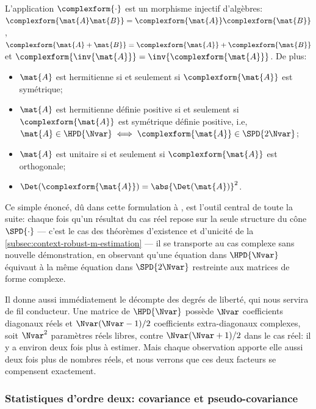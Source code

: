\begin{property}
\label{prop:context-complex-transport}
  L'application $\complexform{\cdot}$ est un morphisme injectif d'algèbres: $\complexform{\mat{A}\mat{B}} = \complexform{\mat{A}}\complexform{\mat{B}}$, $\complexform{\mat{A}+\mat{B}} = \complexform{\mat{A}}+\complexform{\mat{B}}$ et $\complexform{\inv{\mat{A}}} = \inv{\complexform{\mat{A}}}$. De plus:
  \begin{itemize}
    \item $\mat{A}$ est hermitienne si et seulement si $\complexform{\mat{A}}$ est symétrique;
    \item $\mat{A}$ est hermitienne définie positive si et seulement si $\complexform{\mat{A}}$ est symétrique définie positive, i.e, $\mat{A}\in\HPD{\Nvar}\iff\complexform{\mat{A}}\in\SPD{2\Nvar}$;
    \item $\mat{A}$ est unitaire si et seulement si $\complexform{\mat{A}}$ est orthogonale;
    \item $\Det(\complexform{\mat{A}}) = \abs{\Det(\mat{A})}^2$.
  \end{itemize}
\end{property}

\begin{remark}
  Ce simple énoncé, dû dans cette formulation à , est l'outil central de toute la suite: chaque fois qu'un résultat du cas réel repose sur la seule structure du cône $\SPD{\cdot}$ — c'est le cas des théorèmes d'existence et d'unicité de la \cref{subsec:context-robust-m-estimation} — il se transporte au cas complexe sans nouvelle démonstration, en observant qu'une équation dans $\HPD{\Nvar}$ équivaut à la même équation dans $\SPD{2\Nvar}$ restreinte aux matrices de forme complexe.

  Il donne aussi immédiatement le décompte des degrés de liberté, qui nous servira de fil conducteur. Une matrice de $\HPD{\Nvar}$ possède $\Nvar$ coefficients diagonaux réels et $\Nvar(\Nvar-1)/2$ coefficients extra-diagonaux complexes, soit $\Nvar^2$ paramètres réels libres, contre $\Nvar(\Nvar+1)/2$ dans le cas réel: il y a environ deux fois plus à estimer. Mais chaque observation apporte elle aussi deux fois plus de nombres réels, et nous verrons que ces deux facteurs se compensent exactement.
\end{remark}

\subsubsection{Statistiques d'ordre deux: covariance et pseudo-covariance}

